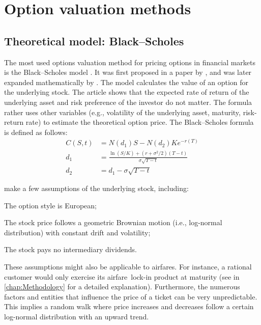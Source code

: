 \section{Option valuation methods}
\subsection{Theoretical model: Black--Scholes}
The most used options valuation method for pricing options in financial markets is the Black--Scholes model \cite{hull99}.  It was first proposed in a paper by , and was later expanded mathematically by . The model calculates the value of an option for the underlying stock. The article shows that the expected rate of return of the underlying asset and risk preference of the investor do not matter. The formula rather uses other variables (e.g., volatility of the underlying asset, maturity, risk-return rate) to estimate the theoretical option price. The Black--Scholes formula is defined as follows:
\begin{align*}
C(S, t) &= N(d_1)S - N(d_2) Ke^{-r(T)} \\
d_1 &= \frac{\ln(S/K) + (r + \sigma^2/2)(T - t)}{\sigma \sqrt{T - t}} \\
d_2 &= d_1 - \sigma \sqrt{T - t}
\end{align*}

\noindent
{} make a few assumptions of the underlying stock, including:
\begin{compactitem}
\item The option style is European;
\item The stock price follows a geometric Brownian motion (i.e., log-normal distribution) with constant drift and volatility;
\item The stock pays no intermediary dividends.
\end{compactitem}

\noindent
These assumptions might also be applicable to airfares. For instance, a rational customer would only exercise its airfare~lock-in product at maturity (see  in \cref{chap:Methodology} for a detailed explanation). Furthermore, the numerous factors and entities that influence the price of a ticket can be very unpredictable. This implies a random walk where price increases and decreases follow a certain log-normal distribution with an upward trend.

